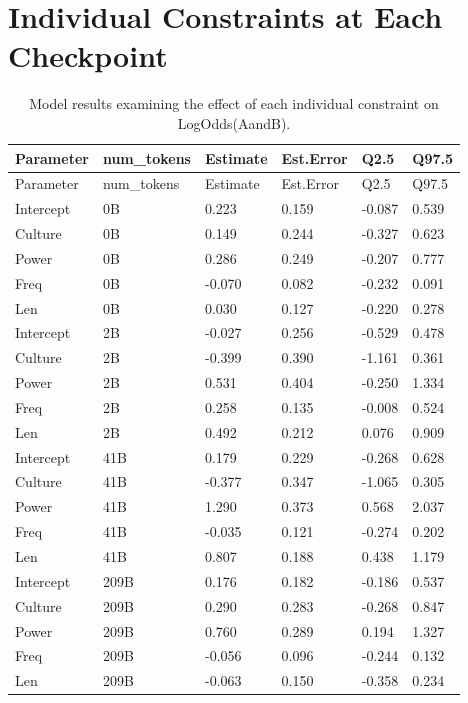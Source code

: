 \documentclass[
  12pt,
  letterpaper,
]{scrreport}
\begin{document}
\chapter{Individual Constraints at Each
Checkpoint}\label{sec-individual-constraints-at-each-checkpoint}

\begin{longtable}[]{@{}llllll@{}}
\caption{Model results examining the effect of each individual
constraint on LogOdds(AandB).}\tabularnewline
\toprule\noalign{}
Parameter & num\_tokens & Estimate & Est.Error & Q2.5 & Q97.5 \\
\midrule\noalign{}
\endfirsthead
\toprule\noalign{}
Parameter & num\_tokens & Estimate & Est.Error & Q2.5 & Q97.5 \\
\midrule\noalign{}
\endhead
\bottomrule\noalign{}
\endlastfoot
Intercept & 0B & 0.223 & 0.159 & -0.087 & 0.539 \\
Culture & 0B & 0.149 & 0.244 & -0.327 & 0.623 \\
Power & 0B & 0.286 & 0.249 & -0.207 & 0.777 \\
Freq & 0B & -0.070 & 0.082 & -0.232 & 0.091 \\
Len & 0B & 0.030 & 0.127 & -0.220 & 0.278 \\
Intercept & 2B & -0.027 & 0.256 & -0.529 & 0.478 \\
Culture & 2B & -0.399 & 0.390 & -1.161 & 0.361 \\
Power & 2B & 0.531 & 0.404 & -0.250 & 1.334 \\
Freq & 2B & 0.258 & 0.135 & -0.008 & 0.524 \\
Len & 2B & 0.492 & 0.212 & 0.076 & 0.909 \\
Intercept & 41B & 0.179 & 0.229 & -0.268 & 0.628 \\
Culture & 41B & -0.377 & 0.347 & -1.065 & 0.305 \\
Power & 41B & 1.290 & 0.373 & 0.568 & 2.037 \\
Freq & 41B & -0.035 & 0.121 & -0.274 & 0.202 \\
Len & 41B & 0.807 & 0.188 & 0.438 & 1.179 \\
Intercept & 209B & 0.176 & 0.182 & -0.186 & 0.537 \\
Culture & 209B & 0.290 & 0.283 & -0.268 & 0.847 \\
Power & 209B & 0.760 & 0.289 & 0.194 & 1.327 \\
Freq & 209B & -0.056 & 0.096 & -0.244 & 0.132 \\
Len & 209B & -0.063 & 0.150 & -0.358 & 0.234 \\

\end{longtable}
\end{document}
